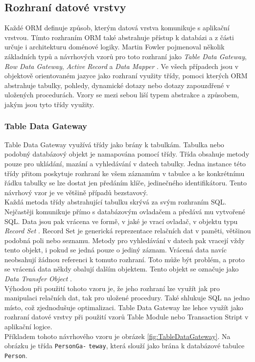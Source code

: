 \documentclass[ing,male,java,dept456]{diploma}						%
\begin{document}
\subsection{Rozhraní datové vrstvy}

Každé ORM definuje způsob, kterým datová vrstva komunikuje s aplikační vrstvou. Tímto rozhraním ORM také abstrahuje přístup k databázi a z části určuje i architekturu doménové logiky. Martin Fowler pojmenoval několik základních typů a návrhových vzorů pro toto rozhraní jako \textit{Table Data Gateway}, \textit{Row Data Gateway}, \textit{Active Record} a \textit{Data Mapper} \cite{fowler}. Ve všech případech jsou v objektově orientovaném jazyce jako rozhraní využity třídy, pomoci kterých ORM abstrahuje tabulky, pohledy, dynamické 	dotazy nebo dotazy zapouzdřené v uložených procedurách. Vzory se mezi sebou liší typem abstrakce a způsobem, jakým jsou tyto třídy využity.

\subsubsection{Table Data Gateway}

Table Data Gateway využívá třídy jako brány k tabulkám. Tabulka nebo podobný databázový objekt je namapována pomocí třídy. Třída obsahuje metody pouze pro ukládání, mazání a vyhledávání v datech tabulky. Jedna instance této třídy přitom poskytuje rozhraní ke všem záznamům v tabulce a ke konkrétnímu řádku tabulky se lze dostat jen předáním klíče, jedinečného identifikátoru. Tento návrhový vzor je ve většině případů bezstavový. \\
Každá metoda třídy abstrahující tabulku skrývá za svým rozhraním SQL. Nejčastěji komunikuje přímo s databázovým ovladačem a předává mu vytvořené SQL. Data jsou pak vrácena ve formě, v jaké je vrací ovladač, v objektu typu \textit{Record Set} \cite{fowler}. Record Set je generická reprezentace relačních dat v paměti, většinou podobná poli nebo seznamu. Metody pro vyhledávání v datech pak vracejí vždy tento objekt, i pokud se jedná pouze o jediný záznam. Vrácená data navíc neobsahují žádnou referenci k tomuto rozhraní. Toto může být problém, a proto se vrácená data někdy obalují dalším objektem. Tento objekt se označuje jako \textit{Data Transfer Object} \cite{fowler}. \\
Výhodou při použití tohoto vzoru je, že jeho rozhraní lze využít jak pro manipulaci relačních dat, tak pro uložené procedury. Také shlukuje SQL na jedno místo, což zjednodušuje optimalizaci. Table Data Gateway lze lehce využít jako rozhraní datové vrstvy při použití vzorů Table Module nebo Transaction Stript v aplikační logice. \\
Příkladem tohoto návrhového vzoru je obrázek \ref{fig:TableDataGateway}. Na obrázku je třída \lstinline[style=inlinepython]|PersonGa-| \lstinline[style=inlinepython]|teway|, která slouží jako brána k databázové tabulce \lstinline[style=inlinepython]|Person|.
\end{document}
